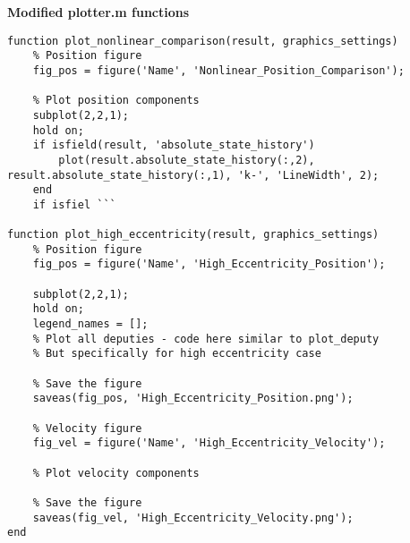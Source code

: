 \textbf{Modified plotter.m functions}
\begin{lstlisting}
function plot_nonlinear_comparison(result, graphics_settings)
    % Position figure
    fig_pos = figure('Name', 'Nonlinear_Position_Comparison');
    
    % Plot position components
    subplot(2,2,1);
    hold on;
    if isfield(result, 'absolute_state_history')
        plot(result.absolute_state_history(:,2), result.absolute_state_history(:,1), 'k-', 'LineWidth', 2);
    end
    if isfiel ```

function plot_high_eccentricity(result, graphics_settings)
    % Position figure
    fig_pos = figure('Name', 'High_Eccentricity_Position');
    
    subplot(2,2,1);
    hold on;
    legend_names = [];
    % Plot all deputies - code here similar to plot_deputy
    % But specifically for high eccentricity case
    
    % Save the figure
    saveas(fig_pos, 'High_Eccentricity_Position.png');
    
    % Velocity figure
    fig_vel = figure('Name', 'High_Eccentricity_Velocity');
    
    % Plot velocity components
    
    % Save the figure
    saveas(fig_vel, 'High_Eccentricity_Velocity.png');
end
\end{lstlisting}